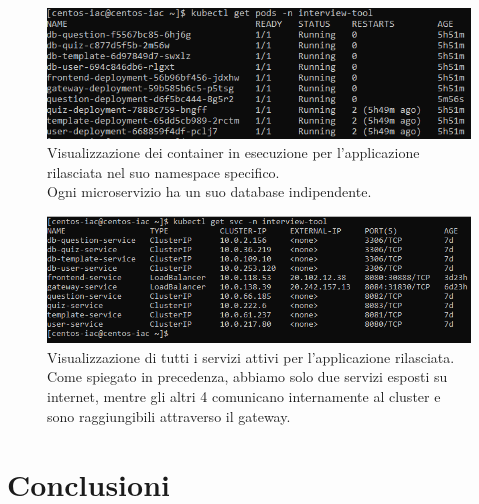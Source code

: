 \documentclass[a4paper,12pt]{report}
\begin{document}
\begin{figure}[h]
	\includegraphics[width=1.0\textwidth]{app_micro2}
    \caption{Visualizzazione dei container in esecuzione per l'applicazione rilasciata nel suo namespace specifico. \\Ogni microservizio ha un suo database indipendente.}
    \label{fig:app_micro2}
\end{figure}

\begin{figure}[h]
	\includegraphics[width=1.0\textwidth]{app_micro3}
    \caption{Visualizzazione di tutti i servizi attivi per l'applicazione rilasciata.\\Come spiegato in precedenza, abbiamo solo due servizi esposti su internet, mentre gli altri 4 comunicano internamente al cluster e sono raggiungibili attraverso il gateway.}
    \label{fig:app_micro3}
\end{figure}

\chapter{Conclusioni}
\end{document}
